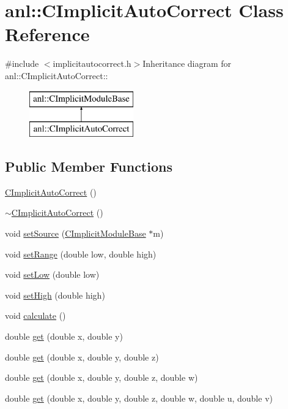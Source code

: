 \hypertarget{classanl_1_1CImplicitAutoCorrect}{
\section{anl::CImplicitAutoCorrect Class Reference}
\label{classanl_1_1CImplicitAutoCorrect}
}


{\ttfamily \#include $<$implicitautocorrect.h$>$}Inheritance diagram for anl::CImplicitAutoCorrect::\begin{figure}[H]
\begin{center}
\leavevmode
\includegraphics[height=2cm]{classanl_1_1CImplicitAutoCorrect}
\end{center}
\end{figure}
\subsection*{Public Member Functions}
\begin{DoxyCompactItemize}
\item 
\hyperlink{classanl_1_1CImplicitAutoCorrect_a418adcdccf2ebffb4a304328addbe04d}{CImplicitAutoCorrect} ()
\item 
\hyperlink{classanl_1_1CImplicitAutoCorrect_a5411875e21e8d910120faf0252a0e8b0}{$\sim$CImplicitAutoCorrect} ()
\item 
void \hyperlink{classanl_1_1CImplicitAutoCorrect_a9cd0fef48a82f446482240484d66fbb7}{setSource} (\hyperlink{classanl_1_1CImplicitModuleBase}{CImplicitModuleBase} $\ast$m)
\item 
void \hyperlink{classanl_1_1CImplicitAutoCorrect_adc8bde0b07be66e0605c9e48a294ee39}{setRange} (double low, double high)
\item 
void \hyperlink{classanl_1_1CImplicitAutoCorrect_a152d8d74e2ffcd19c75d867ac86a42b0}{setLow} (double low)
\item 
void \hyperlink{classanl_1_1CImplicitAutoCorrect_a1274d40ccdce37d6c9f35df7e4a8f46d}{setHigh} (double high)
\item 
void \hyperlink{classanl_1_1CImplicitAutoCorrect_ab76cb5d3a15d1e189e0604969c7811b4}{calculate} ()
\item 
double \hyperlink{classanl_1_1CImplicitAutoCorrect_a134b304eeb21068a96cbdcb8427af104}{get} (double x, double y)
\item 
double \hyperlink{classanl_1_1CImplicitAutoCorrect_a8b9fafdbf1e508a461d8fca1e60172eb}{get} (double x, double y, double z)
\item 
double \hyperlink{classanl_1_1CImplicitAutoCorrect_a6f0ceb8d4b002577185b2004c77f9375}{get} (double x, double y, double z, double w)
\item 
double \hyperlink{classanl_1_1CImplicitAutoCorrect_ade9981b74d7798d6ad2840f57c191d45}{get} (double x, double y, double z, double w, double u, double v)
\end{DoxyCompactItemize}
